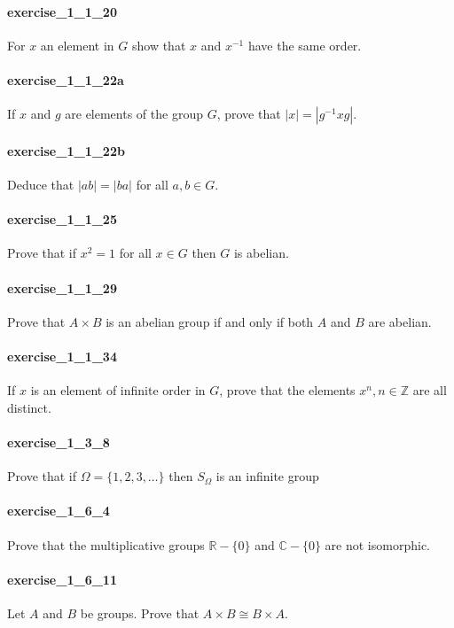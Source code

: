 \documentclass{article}
\begin{document}
\paragraph{exercise\_1\_1\_20} For $x$ an element in $G$ show that $x$ and $x^{-1}$ have the same order.

\paragraph{exercise\_1\_1\_22a} If $x$ and $g$ are elements of the group $G$, prove that $|x|=\left|g^{-1} x g\right|$.

\paragraph{exercise\_1\_1\_22b} Deduce that $|a b|=|b a|$ for all $a, b \in G$.

\paragraph{exercise\_1\_1\_25} Prove that if $x^{2}=1$ for all $x \in G$ then $G$ is abelian.

\paragraph{exercise\_1\_1\_29} Prove that $A \times B$ is an abelian group if and only if both $A$ and $B$ are abelian.

\paragraph{exercise\_1\_1\_34} If $x$ is an element of infinite order in $G$, prove that the elements $x^{n}, n \in \mathbb{Z}$ are all distinct.

\paragraph{exercise\_1\_3\_8} Prove that if $\Omega=\{1,2,3, \ldots\}$ then $S_{\Omega}$ is an infinite group

\paragraph{exercise\_1\_6\_4} Prove that the multiplicative groups $\mathbb{R}-\{0\}$ and $\mathbb{C}-\{0\}$ are not isomorphic.

\paragraph{exercise\_1\_6\_11} Let $A$ and $B$ be groups. Prove that $A \times B \cong B \times A$.
\end{document}
